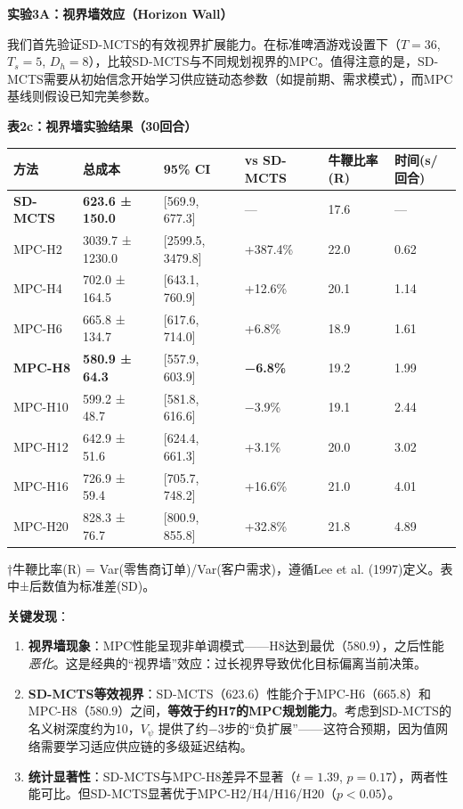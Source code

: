 \documentclass[UTF8]{ctexart}
\begin{document}
\textbf{实验3A：视界墙效应（Horizon Wall）}

我们首先验证SD-MCTS的有效视界扩展能力。在标准啤酒游戏设置下（\(T=36\),
\(T_s=5\),
\(D_h=8\)），比较SD-MCTS与不同规划视界的MPC。值得注意的是，SD-MCTS需要从初始信念开始学习供应链动态参数（如提前期、需求模式），而MPC基线则假设已知完美参数。

\textbf{表2c：视界墙实验结果（30回合）}

\begin{table}[h]
\centering
\begin{tabular}{p{2.5cm}p{3cm}p{2.5cm}p{2.5cm}p{2.5cm}p{2cm}}
\toprule
\textbf{方法} & \textbf{总成本} & \textbf{95\% CI} & \textbf{vs SD-MCTS} & \textbf{牛鞭比率(R)} & \textbf{时间(s/回合)} \\
\midrule
\textbf{SD-MCTS} & \textbf{623.6 ± 150.0} & [569.9, 677.3] & --- & 17.6 & --- \\
MPC-H2 & 3039.7 ± 1230.0 & [2599.5, 3479.8] & +387.4\% & 22.0 & 0.62 \\
MPC-H4 & 702.0 ± 164.5 & [643.1, 760.9] & +12.6\% & 20.1 & 1.14 \\
MPC-H6 & 665.8 ± 134.7 & [617.6, 714.0] & +6.8\% & 18.9 & 1.61 \\
\textbf{MPC-H8} & \textbf{580.9 ± 64.3} & [557.9, 603.9] & \textbf{−6.8\%} & 19.2 & 1.99 \\
MPC-H10 & 599.2 ± 48.7 & [581.8, 616.6] & −3.9\% & 19.1 & 2.44 \\
MPC-H12 & 642.9 ± 51.6 & [624.4, 661.3] & +3.1\% & 20.0 & 3.02 \\
MPC-H16 & 726.9 ± 59.4 & [705.7, 748.2] & +16.6\% & 21.0 & 4.01 \\
MPC-H20 & 828.3 ± 76.7 & [800.9, 855.8] & +32.8\% & 21.8 & 4.89 \\
\bottomrule
\end{tabular}
\end{table}

†牛鞭比率(R) = Var(零售商订单)/Var(客户需求)，遵循Lee et al.
(1997)定义。表中±后数值为标准差(SD)。

\textbf{关键发现}：

\begin{enumerate}
\def\labelenumi{\arabic{enumi}.}
\item
  \textbf{视界墙现象}：MPC性能呈现非单调模式------H8达到最优（580.9），之后性能\emph{恶化}。这是经典的``视界墙''效应：过长视界导致优化目标偏离当前决策。
\item
  \textbf{SD-MCTS等效视界}：SD-MCTS（623.6）性能介于MPC-H6（665.8）和MPC-H8（580.9）之间，\textbf{等效于约H7的MPC规划能力}。考虑到SD-MCTS的名义树深度约为10，\(V_\psi\)
  提供了约−3步的``负扩展''------这符合预期，因为值网络需要学习适应供应链的多级延迟结构。
\item
  \textbf{统计显著性}：SD-MCTS与MPC-H8差异不显著（\(t=1.39\),
  \(p=0.17\)），两者性能可比。但SD-MCTS显著优于MPC-H2/H4/H16/H20（\(p<0.05\)）。
\end{enumerate}
\end{document}
